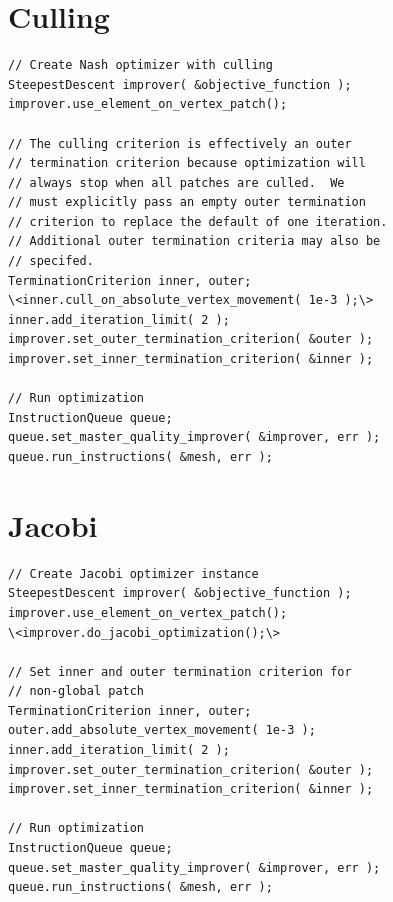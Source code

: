 \section{Culling \label{sec:culling}}


\begin{lstlisting}[frame=single]
// Create Nash optimizer with culling
SteepestDescent improver( &objective_function );
improver.use_element_on_vertex_patch();

// The culling criterion is effectively an outer
// termination criterion because optimization will
// always stop when all patches are culled.  We
// must explicitly pass an empty outer termination
// criterion to replace the default of one iteration.
// Additional outer termination criteria may also be
// specifed.
TerminationCriterion inner, outer;
\<inner.cull_on_absolute_vertex_movement( 1e-3 );\>
inner.add_iteration_limit( 2 );
improver.set_outer_termination_criterion( &outer );
improver.set_inner_termination_criterion( &inner );

// Run optimization
InstructionQueue queue;
queue.set_master_quality_improver( &improver, err );
queue.run_instructions( &mesh, err );
\end{lstlisting}

\section{Jacobi \label{sec:jacobi}}

\begin{lstlisting}[frame=single]
// Create Jacobi optimizer instance
SteepestDescent improver( &objective_function );
improver.use_element_on_vertex_patch();
\<improver.do_jacobi_optimization();\>

// Set inner and outer termination criterion for
// non-global patch
TerminationCriterion inner, outer;
outer.add_absolute_vertex_movement( 1e-3 );
inner.add_iteration_limit( 2 );
improver.set_outer_termination_criterion( &outer );
improver.set_inner_termination_criterion( &inner );

// Run optimization
InstructionQueue queue;
queue.set_master_quality_improver( &improver, err );
queue.run_instructions( &mesh, err );
\end{lstlisting}


